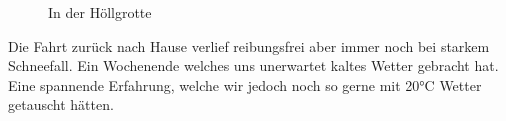 \begin{figure}[H]
   \centering
   \quad
   \quad
   \quad
   \caption[In der Höllgrotte]{In der Höllgrotte}
\end{figure}

Die Fahrt zurück nach Hause verlief reibungsfrei aber immer noch bei starkem Schneefall.
Ein Wochenende welches uns unerwartet kaltes Wetter gebracht hat.
Eine spannende Erfahrung, welche wir jedoch noch so gerne mit 20°C Wetter getauscht hätten.
